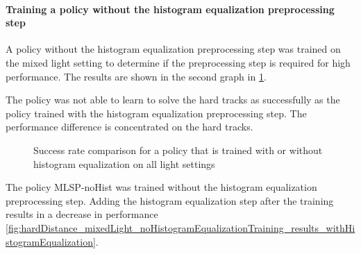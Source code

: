 \paragraph{Training a policy without the histogram equalization preprocessing step}
A policy without the histogram equalization preprocessing step was trained on the mixed light setting to determine if the preprocessing step is required for high performance. The results are shown in the second graph in \ref{fig:hardDistance_mixedLight_noHistogramEqualizationTraining_results}. 

The policy was not able to learn to solve the hard tracks as successfully as the policy trained with the histogram equalization preprocessing step. The performance difference is concentrated on the hard tracks.

\begin{figure}
    \centering
    \caption{Success rate comparison for a policy that is trained with or without histogram equalization on all light settings}
    \label{fig:hardDistance_mixedLight_noHistogramEqualizationTraining_results}
\end{figure}


The policy \acs{MLSP-noHist} was trained without the histogram equalization preprocessing step. Adding the histogram equalization step after the training results in a decrease in performance \ref{fig:hardDistance_mixedLight_noHistogramEqualizationTraining_results_withHistogramEqualization}. 

